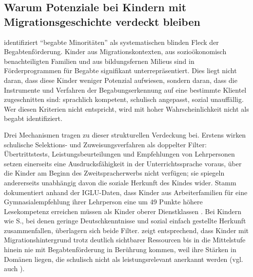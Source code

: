\documentclass[ngerman, a4paper]{article}
\begin{document}
\subsection{Warum Potenziale bei Kindern mit Migrationsgeschichte verdeckt bleiben}

\textcite[S.\,576--587]{stamm2021fehlenderblick} identifiziert \enquote{begabte Minoritäten} als systematischen blinden Fleck der
Begabtenförderung. Kinder aus Migrationskontexten, aus sozioökonomisch benachteiligten
Familien und aus bildungsfernen Milieus sind in Förderprogrammen für Begabte signifikant
unterrepräsentiert. Dies liegt nicht daran, dass diese Kinder weniger Potenzial aufwiesen,
sondern daran, dass die Instrumente und Verfahren der Begabungserkennung auf eine
bestimmte Klientel zugeschnitten sind: sprachlich kompetent, schulisch angepasst,
sozial unauffällig. Wer diesen Kriterien nicht
entspricht, wird mit hoher Wahrscheinlichkeit nicht als begabt identifiziert.

Drei Mechanismen tragen zu dieser strukturellen Verdeckung bei. Erstens
wirken schulische Selektions- und Zuweisungsverfahren als doppelter Filter:
Übertrittstests, Leistungsbeurteilungen und Empfehlungen von Lehrpersonen
setzen einerseits eine Ausdrucksfähigkeit in der Unterrichtssprache voraus,
über die Kinder am Beginn des Zweitspracherwerbs nicht verfügen; sie
spiegeln andererseits unabhängig davon die soziale Herkunft des Kindes
wider. Stamm dokumentiert anhand der IGLU-Daten, dass Kinder aus
Arbeiterfamilien für eine Gymnasialempfehlung ihrer Lehrperson eine um
49 Punkte höhere Lesekompetenz erreichen müssen als Kinder oberer
Dienstklassen \parencite[S.\,36--37]{stamm2025vonuntennachoben}. Bei
Kindern wie S., bei denen geringe Deutschkenntnisse und sozial einfach
gestellte Herkunft zusammenfallen, überlagern sich beide Filter.
\textcite[S.\,76--78]{kellerkoller2021hellekoepfe} zeigt entsprechend, dass
Kinder mit Migrationshintergrund trotz deutlich sichtbarer Ressourcen bis
in die Mittelstufe hinein nie mit Begabtenförderung in Berührung kommen,
weil ihre Stärken in Domänen liegen, die schulisch nicht als
leistungsrelevant anerkannt werden (vgl. auch
\textcite{kellerkoller2011erkennen}).
\end{document}

